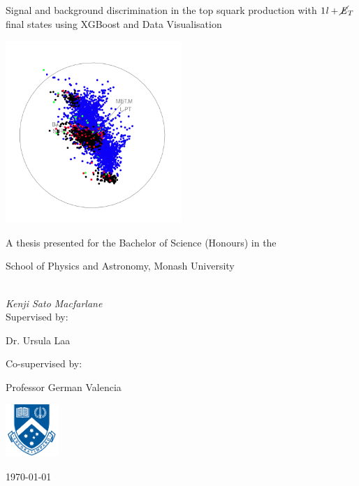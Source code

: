 \documentclass[12pt,a4paper]{report}
\begin{document}
\begin{titlepage}


				\centering

				{\Large{}\selectfont Signal and background discrimination in the top squark production with   $\text{1\textit{l}} + \cancel{\it{E}}_{T} $ final states using XGBoost and Data Visualisation \par}
				\vspace{1.0cm}
			    \includegraphics[width=0.5\textwidth]{title.png}\par\vspace{0.5cm}
				{\Large A thesis presented for the Bachelor of Science (Honours) in the \par School of Physics and Astronomy, Monash University}\\
				\vspace{0.5cm}
				{\large\itshape Kenji Sato Macfarlane\\}
				\vfill
				Supervised by:\par
				Dr. Ursula Laa \par 
				Co-supervised by:\par
				Professor German Valencia \\
				
				\vspace{0.5cm}
				
			
			\includegraphics[width=0.15\textwidth]{monashlogo.png}\par\vspace{0.25cm}
				
				{\large \today\par}

\end{titlepage}
\end{document}
